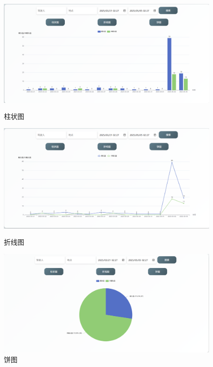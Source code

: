 \begin{figure}[!htb]
    \centering
    \begin{minipage}{0.3\textwidth} %
        \centering
        \includegraphics[width=\textwidth]{figs/chap05/data1.png}
        \caption{柱状图}
        \label{fig:data1}
    \end{minipage}
    \hfill %
    \begin{minipage}{0.3\textwidth}
        \centering
        \includegraphics[width=\textwidth]{figs/chap05/data2.png}
        \caption{折线图}
        \label{fig:data2}
    \end{minipage}    
    \hfill %
    \begin{minipage}{0.3\textwidth}
        \centering
        \includegraphics[width=\textwidth]{figs/chap05/data3.png}
        \caption{饼图}
        \label{fig:data3}
    \end{minipage}
  \end{figure}

